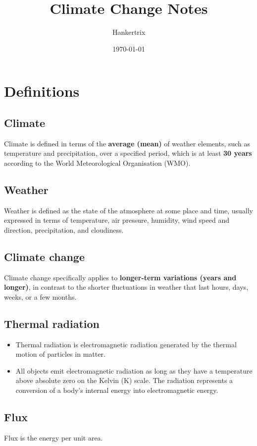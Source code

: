 \documentclass[11pt]{article}
\author{Hankertrix}
\date{\today}
\title{Climate Change Notes}
\begin{document}
\maketitle
\setcounter{tocdepth}{2}
\tableofcontents \clearpage\section{Definitions}
\label{sec:org6303816}

\subsection{Climate}
\label{sec:org71c3631}
Climate is defined in terms of the \textbf{average (mean)} of weather elements, such as temperature and precipitation, over a specified period, which is at least \textbf{30 years} according to the World Meteorological Organisation (WMO).
\subsection{Weather}
\label{sec:org207fca8}
Weather is defined as the state of the atmosphere at some place and time, usually expressed in terms of temperature, air pressure, humidity, wind speed and direction, precipitation, and cloudiness.
\subsection{Climate change}
\label{sec:org35cca78}
Climate change specifically applies to \textbf{longer-term variations (years and longer)}, in contrast to the shorter fluctuations in weather that last hours, days, weeks, or a few months.
\subsection{Thermal radiation}
\label{sec:orgf64a9b9}
\begin{itemize}
\item Thermal radiation is electromagnetic radiation generated by the thermal motion of particles in matter.
\item All objects emit electromagnetic radiation as long as they have a temperature above absolute zero on the Kelvin (K) scale. The radiation represents a conversion of a body's internal energy into electromagnetic energy.
\end{itemize}
\subsection{Flux}
\label{sec:org9e88267}
Flux is the energy per unit area.
\end{document}

